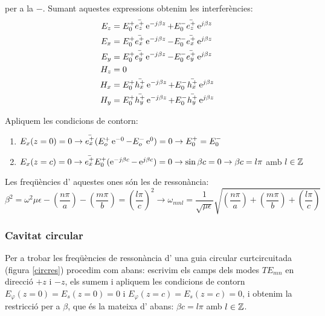 per a la $-$. Sumant aquestes expressions obtenim les interferències:
\begin{subequations}
  \begin{align}
    E_z &= E_0 ^+ \bar{ e_z ^+} \operatorname{e}^{-j \beta z} + E_0 ^- \bar{ e_z ^+} \operatorname{e}^{j \beta z} \\
    E_x &= E_0 ^+ \bar{ e_x ^+} \operatorname{e}^{-j \beta z} - E_0 ^- \bar{ e_x ^+} \operatorname{e}^{j \beta z}  \\
    E_y &= E_0 ^+ \bar{ e_y ^+} \operatorname{e}^{-j \beta z} - E_0 ^- \bar{ e_y ^+} \operatorname{e}^{j \beta z}  \\    
    H_z &= 0 \\
    H_x &= E_0 ^+ \bar{ h_x ^+} \operatorname{e}^{-j \beta z} + E_0 ^- \bar{ h_x ^+} \operatorname{e}^{j \beta z}  \\
    H_y &= E_0 ^+ \bar{ h_y ^+} \operatorname{e}^{-j \beta z} + E_0 ^- \bar{ h_y ^+} \operatorname{e}^{j \beta z} 
  \end{align}
\end{subequations}

Apliquem les condicions de contorn:
\begin{enumerate}
  \item{$E_x (z=0) = 0 \to \bar{e_x ^+} ( E_o ^+ \operatorname{e}^{-0} - E_o ^- \operatorname{e}^{0}) = 0 \to E_0 ^+ = E_0 ^- $}
  \item{$E_x (z=c) = 0 \to \bar{e_x ^ +} E_0 ^+ ( \operatorname{e}^{- j \beta c} - \operatorname{e}^{j \beta c}) = 0 \to \sin \beta c = 0 \to \beta c = l \pi$ amb $l \in \mathbb Z$}
\end{enumerate}

Les freqüències d' aquestes ones són les de ressonància:
\begin{equation}
 \beta ^2 =  \omega ^ 2 \mu \epsilon - \left ( \frac{n \pi}{a} \right ) - \left ( \frac{m \pi}{b} \right ) = \left ( \frac{l\pi}{c} \right ) ^2 \to  \omega _{mnl} = \frac{1}{\sqrt{\mu \epsilon}} \sqrt{ \left ( \frac{n \pi}{a} \right ) + \left ( \frac{m \pi}{b} \right ) + \left ( \frac{l \pi}{c} \right )}
\end{equation}

\subsubsection{Cavitat circular}

Per a trobar les freqüències de ressonància d' una guia circular curtcircuitada (figura \cref{circres}) procedim com abans: escrivim els camps dels modes $TE_{mn}$ en direcció $+z$ i $-z$, els sumem i apliquem les condicions de contorn $E_{\varphi}(z=0) = E_s (z=0) = 0$ i $E_{\varphi}(z=c) = E_s (z=c) = 0$, i obtenim la restricció per a $\beta$, que és la mateixa d' abans: $\beta c = l \pi$ amb $l \in \mathbb Z$. 


